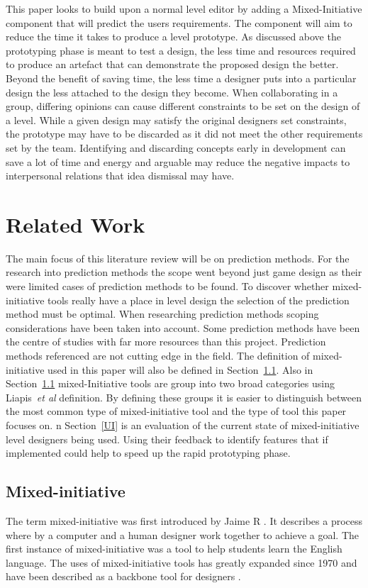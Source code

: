 \documentclass[journal]{IEEEtran}
\begin{document}
This paper looks to build upon  a normal level editor by adding a Mixed-Initiative component that will predict the users requirements. The component will aim to reduce the time it takes to produce a level prototype. As discussed above the prototyping phase is meant to test a design, the less time and resources required to produce an artefact that can demonstrate the proposed design the better. Beyond the benefit of saving time, the less time a designer puts into a particular design the less attached to the design they become. When collaborating in a group, differing opinions can cause different constraints to be set on the design of a level. While a given design may satisfy the original designers set constraints, the prototype may have to be discarded as it did not meet the other requirements set by the team. Identifying and discarding concepts early in development can save a lot of time and energy \cite[p.489]{stempfle1999thinking} and arguable may reduce the negative impacts to interpersonal relations that idea dismissal may have. 

\section{Related Work}
The main focus of this literature review will be on prediction methods. For the research into prediction methods the scope went beyond just game design as their were limited cases of prediction methods to be found. To discover whether mixed-initiative tools really have a place in level design the selection of the prediction method must be optimal. When researching prediction methods scoping considerations have been taken into account. Some prediction methods have been the centre of studies with far more resources than this project. Prediction methods referenced are not cutting edge in the field.  The definition of mixed-initiative used in this paper will also be defined in  Section~\ref{MI}.  Also in Section~\ref{MI} mixed-Initiative tools are group into two broad categories using Liapis~\textit{et al}\cite{liapis2016mixed} definition. By defining these groups it is easier to distinguish between the most common type of mixed-initiative tool and the type of tool this paper focuses on.  n Section~\ref{UI} is an evaluation of the current state of mixed-initiative level designers being used. Using their feedback to identify features that if implemented could help to speed up the rapid prototyping phase. 

\subsection{Mixed-initiative} \label{MI}
The term mixed-initiative was first introduced by Jaime R \cite{carbonell1970mixed}.
It describes a process where by a computer and a human designer work together to achieve a goal. The first instance of mixed-initiative was a tool to help students learn the English language. The uses of mixed-initiative tools has greatly expanded since 1970 and have been described as a backbone tool for designers \cite{alvarez2018fostering}.
\end{document}
